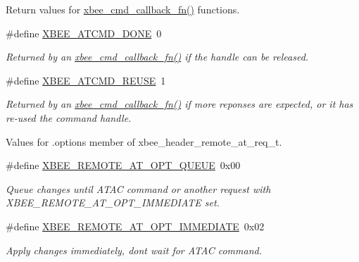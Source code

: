 \label{_amgrp01747264fe7bf50731df0522c351974e}%
Return values for \hyperlink{group__xbee__atcmd_ga113cbd0a40a638710974218de5f885fe}{xbee\+\_\+cmd\+\_\+callback\+\_\+fn()} functions. \begin{DoxyCompactItemize}
\item 
\mbox{\label{group__xbee__atcmd_gad51a6fee7843df5a5bfd6f3957465426}} 
\#define \hyperlink{group__xbee__atcmd_gad51a6fee7843df5a5bfd6f3957465426}{X\+B\+E\+E\+\_\+\+A\+T\+C\+M\+D\+\_\+\+D\+O\+NE}~0
\begin{DoxyCompactList}\small\item\em Returned by an \hyperlink{group__xbee__atcmd_ga113cbd0a40a638710974218de5f885fe}{xbee\+\_\+cmd\+\_\+callback\+\_\+fn()} if the handle can be released. \end{DoxyCompactList}\item 
\#define \hyperlink{group__xbee__atcmd_ga9a5078393806d67903c87b3c82597fb1}{X\+B\+E\+E\+\_\+\+A\+T\+C\+M\+D\+\_\+\+R\+E\+U\+SE}~1
\begin{DoxyCompactList}\small\item\em Returned by an \hyperlink{group__xbee__atcmd_ga113cbd0a40a638710974218de5f885fe}{xbee\+\_\+cmd\+\_\+callback\+\_\+fn()} if more reponses are expected, or it has re-\/used the command handle. \end{DoxyCompactList}\end{DoxyCompactItemize}
\label{_amgrp01747264fe7bf50731df0522c351974e}%
Values for {\ttfamily }.options member of xbee\+\_\+header\+\_\+remote\+\_\+at\+\_\+req\+\_\+t. \begin{DoxyCompactItemize}
\item 
\#define \hyperlink{group__xbee__atcmd_ga3ca0a18e4e629050e8f1387f72638f69}{X\+B\+E\+E\+\_\+\+R\+E\+M\+O\+T\+E\+\_\+\+A\+T\+\_\+\+O\+P\+T\+\_\+\+Q\+U\+E\+UE}~0x00
\begin{DoxyCompactList}\small\item\em Queue changes until A\+T\+AC command or another request with X\+B\+E\+E\+\_\+\+R\+E\+M\+O\+T\+E\+\_\+\+A\+T\+\_\+\+O\+P\+T\+\_\+\+I\+M\+M\+E\+D\+I\+A\+TE set. \end{DoxyCompactList}\item 
\mbox{\label{group__xbee__atcmd_ga61c52828070a499e9fbfc4e6edef158b}} 
\#define \hyperlink{group__xbee__atcmd_ga61c52828070a499e9fbfc4e6edef158b}{X\+B\+E\+E\+\_\+\+R\+E\+M\+O\+T\+E\+\_\+\+A\+T\+\_\+\+O\+P\+T\+\_\+\+I\+M\+M\+E\+D\+I\+A\+TE}~0x02
\begin{DoxyCompactList}\small\item\em Apply changes immediately, don\textquotesingle{}t wait for A\+T\+AC command. \end{DoxyCompactList}\end{DoxyCompactItemize}


